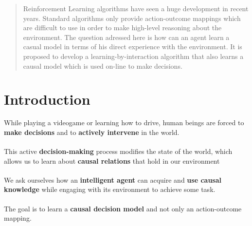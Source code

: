 \documentclass[a0,portrait]{a0poster}
\begin{document}
\begin{multicols}{3} %


\color{Navy} %

\begin{abstract}
Reinforcement Learning algorithms have seen a huge development in recent years. Standard algorithms only provide action-outcome mappings which are difficult to use in order to make high-level reasoning about the environment. The question adressed here is how can an agent learn a casual model in terms of his direct experience with the environment. It is proposed to develop a learning-by-interaction algorithm that also learns a causal model which is used on-line to make decisions. 
\end{abstract}
\color{SaddleBrown} %
\section*{Introduction}
While playing a videogame or learning how to drive, human beings are forced to \textbf{make decisions} and to \textbf{actively intervene} in the world.\\
\\
This active \textbf{decision-making} process modifies the state of the world, which allows us to learn about \textbf{causal relations} that hold in our environment\\
\\
We ask ourselves how an \textbf{intelligent agent} can acquire and \textbf{use causal knowledge} while engaging with its environment to achieve some task.\\
\\
The goal is to learn a \textbf{causal decision model} and not only an action-outcome mapping.


\end{multicols}
\end{document}
